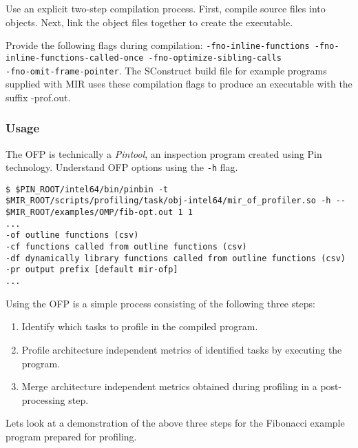 \documentclass[11pt,a4paper]{article}
\begin{document}
Use an explicit two-step compilation process. First, compile source files into objects. Next, link the object files together to create the executable.

Provide the following flags during compilation:
\texttt{-fno-inline-functions -fno-inline-functions-called-once -fno-optimize-sibling-calls \\ -fno-omit-frame-pointer}. The \textsf{SConstruct} build file for example programs supplied with MIR uses these compilation flags to produce an executable with the suffix \textsf{-prof.out}.

\subsubsection{Usage}

The OFP is technically a \textit{Pintool}, an inspection program created using Pin technology. Understand OFP options using the \texttt{-h} flag.

\begin{lstlisting}[style=MyInputStyle]
$ $PIN_ROOT/intel64/bin/pinbin -t $MIR_ROOT/scripts/profiling/task/obj-intel64/mir_of_profiler.so -h -- $MIR_ROOT/examples/OMP/fib-opt.out 1 1
...
-of outline functions (csv)
-cf functions called from outline functions (csv)
-df dynamically library functions called from outline functions (csv)
-pr output prefix [default mir-ofp]
...
\end{lstlisting}

Using the OFP is a simple process consisting of the following three steps:

\begin{enumerate}
    \item Identify which tasks to profile in the compiled program.
    \item Profile architecture independent metrics of identified tasks by executing the program.
    \item Merge architecture independent metrics obtained during profiling in a post-processing step.
\end{enumerate}

Lets look at a demonstration of the above three steps for the Fibonacci example program prepared for profiling.
\end{document}
